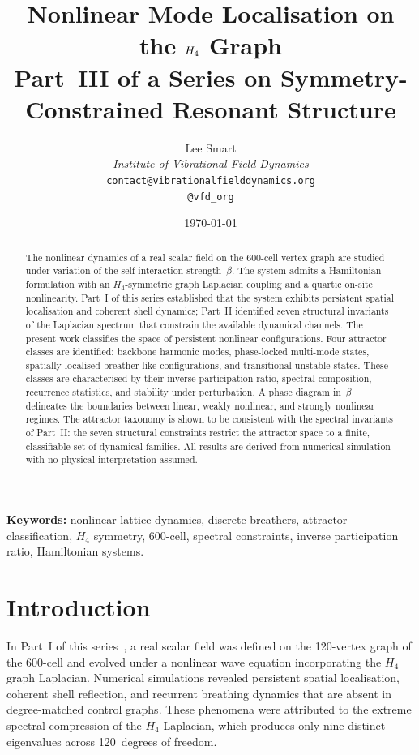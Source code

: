 \documentclass[12pt,a4paper]{article}
\title{%
  \textbf{Nonlinear Mode Localisation on the $\Hfour$ Graph}\\[6pt]
  \large Part~III of a Series on Symmetry-Constrained Resonant Structure%
}
\author{%
  Lee Smart\\[4pt]
  \textit{Institute of Vibrational Field Dynamics}\\[2pt]
  \texttt{contact@vibrationalfielddynamics.org}\\[2pt]
  \texttt{@vfd\_org}%
}
\date{\today}
\newcommand{\Hfour}{H_4}
\begin{document}
\maketitle
\thispagestyle{empty}

\begin{abstract}
The nonlinear dynamics of a real scalar field on the 600-cell vertex
graph are studied under variation of the self-interaction strength~$\beta$.
The system admits a Hamiltonian formulation with an $\Hfour$-symmetric
graph Laplacian coupling and a quartic on-site nonlinearity.
Part~I of this series established that the system exhibits persistent
spatial localisation and coherent shell dynamics; Part~II identified
seven structural invariants of the Laplacian spectrum that constrain
the available dynamical channels.
The present work classifies the space of persistent nonlinear
configurations.  Four attractor classes are identified: backbone
harmonic modes, phase-locked multi-mode states, spatially localised
breather-like configurations, and transitional unstable states.
These classes are characterised by their inverse participation ratio,
spectral composition, recurrence statistics, and stability under
perturbation.  A phase diagram in~$\beta$ delineates the boundaries
between linear, weakly nonlinear, and strongly nonlinear regimes.
The attractor taxonomy is shown to be consistent with the spectral
invariants of Part~II: the seven structural constraints restrict the
attractor space to a finite, classifiable set of dynamical families.
All results are derived from numerical simulation with no physical
interpretation assumed.
\end{abstract}

\vspace{1em}
\noindent\textbf{Keywords:}
nonlinear lattice dynamics, discrete breathers, attractor classification,
$\Hfour$ symmetry, 600-cell, spectral constraints, inverse participation
ratio, Hamiltonian systems.

\newpage
\tableofcontents
\newpage


\section{Introduction}\label{sec:intro}

In Part~I of this series~\cite{paper1}, a real scalar field was defined
on the 120-vertex graph of the 600-cell and evolved under a nonlinear
wave equation incorporating the $\Hfour$ graph Laplacian.  Numerical
simulations revealed persistent spatial localisation, coherent shell
reflection, and recurrent breathing dynamics that are absent in
degree-matched control graphs.  These phenomena were attributed to the
extreme spectral compression of the $\Hfour$ Laplacian, which produces
only nine distinct eigenvalues across 120~degrees of freedom.
\end{document}
